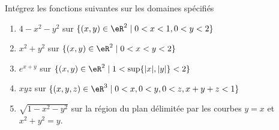 
\begin{exercice}\label{exoIntMult0001}

	Intégrez les fonctions suivantes sur les domaines spécifiés
	\begin{enumerate}
		\item $ 4 - x^2 - y^2$ sur  $\{(x,y)\in \eR^2 \mid 0<x<1, 0<y<2 \} $
		\item $ x^2 + y^2$ sur $\{(x,y)\in \eR^2 \mid 0<x<y<2 \} $
		\item $ e^{x+y}$ sur $\{(x,y)\in \eR^2 \mid 1 < \sup\{|x|,|y|\} < 2 \} $
		\item $ xyz$ sur $\{(x,y,z)\in \eR^3 \mid 0<x, 0<y, 0<z, x+y+z<1 \} $
		\item $ \sqrt{1-x^2-y^2}$  sur la région du plan délimitée par les  courbes $y = x$ et $x^2+y^2=y$.
	\end{enumerate}

\end{exercice}
